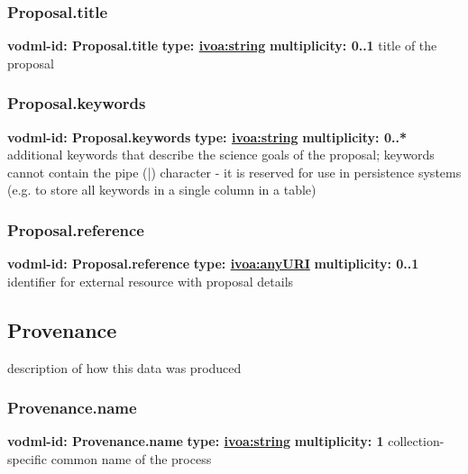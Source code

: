     \subsubsection{Proposal.title}
      \textbf{vodml-id: Proposal.title} \newline
      \textbf{type: \hyperref[sect:ivoa]{ivoa:string}} \newline
      \textbf{multiplicity: 0..1} \newline
      title of the proposal

    \subsubsection{Proposal.keywords}
      \textbf{vodml-id: Proposal.keywords} \newline
      \textbf{type: \hyperref[sect:ivoa]{ivoa:string}} \newline
      \textbf{multiplicity: 0..*} \newline
      additional keywords that describe the science goals of the proposal; keywords cannot contain the pipe (|) character - it is reserved for use in persistence systems (e.g. to store all keywords in a single column in a table)

    \subsubsection{Proposal.reference}
      \textbf{vodml-id: Proposal.reference} \newline
      \textbf{type: \hyperref[sect:ivoa]{ivoa:anyURI}} \newline
      \textbf{multiplicity: 0..1} \newline
      identifier for external resource with proposal details

  \subsection{Provenance}
  \label{sect:Provenance}
    description of how this data was produced

    \subsubsection{Provenance.name}
      \textbf{vodml-id: Provenance.name} \newline
      \textbf{type: \hyperref[sect:ivoa]{ivoa:string}} \newline
      \textbf{multiplicity: 1} \newline
      collection-specific common name of the process

